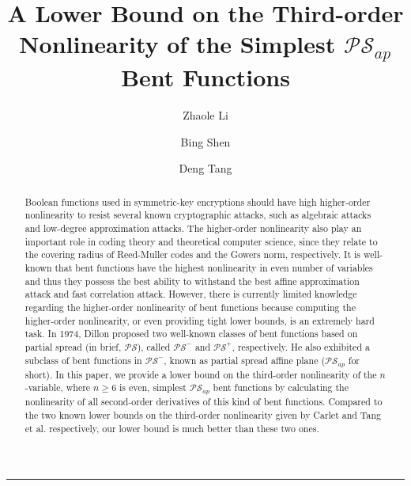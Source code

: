 \documentclass{article}
\title{A Lower Bound on the Third-order Nonlinearity of the Simplest $\mathcal{PS}_{ap}$ Bent Functions}
\author[a]{Zhaole Li}
\author[b]{Bing Shen}
\author[a,b]{Deng Tang}
\affil[a]{School of Electronic Information and Electrical Engineering, Shanghai Jiao Tong University, Shanghai 200240, China}
\affil[b]{Science and Technology on Communication Security Laboratory, Chengdu 610041, Sichuan, China}
\newcommand{\0}{\textbf{0}}
\newcommand{\1}{\textbf{1}}
\theoremstyle{plain}
\begin{document}
 \maketitle
  \noindent
  \rule{\linewidth}{0.4pt}

\begin{abstract}
Boolean functions used in symmetric-key encryptions should have high higher-order nonlinearity to resist several known cryptographic attacks, 
such as algebraic attacks and low-degree approximation attacks.
The higher-order nonlinearity also play an important role in coding theory and theoretical computer science, since they relate to the covering radius of Reed-Muller codes and the Gowers norm, respectively.  
It is well-known that bent functions have the highest nonlinearity in even number of variables and thus they possess 
the best ability to withstand the best affine approximation attack and fast correlation attack.
However, there is currently limited knowledge regarding the higher-order nonlinearity of bent functions
because computing the higher-order nonlinearity, or even providing tight lower bounds, is an extremely hard task.
In 1974, Dillon proposed two well-known classes of bent functions based on partial spread (in brief, $\mathcal{PS}$), called
$\mathcal{PS}^-$ and $\mathcal{PS}^+$, respectively. He also exhibited a subclass of bent functions in $\mathcal{PS}^-$, known as
partial spread affine plane ($\mathcal{PS}_{ap}$ for short).
In this paper, we provide a lower bound on the third-order nonlinearity of the $n$-variable, where $n\ge 6$ is even, simplest $\mathcal{PS}_{ap}$ bent functions by calculating the nonlinearity of all second-order derivatives of this kind of bent functions.
Compared to the two known lower bounds on the third-order nonlinearity given by Carlet and Tang et al. respectively,
our lower bound is much better than these two ones.
\end{abstract}
\end{document}
